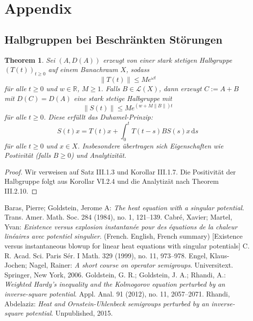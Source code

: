 \documentclass[11pt]{article}
\newtheorem{thm}{Theorem}
\theoremstyle{break}
\begin{document}
\section{Appendix}
\subsection{Halbgruppen bei Beschränkten Störungen}
\begin{thm}\label{bounded}
Sei $(A, D(A))$ erzeugt von einer stark stetigen Halbgruppe $(T(t))_{t\ge 0}$ auf einem Banachraum $X$, sodass
\begin{equation}
\|T(t)\|\le M e^{\omega t}
\end{equation}
für alle $t\ge 0$ und $w\in \mathbb R$, $M\ge 1$. Falls $B\in \mathcal L(X)$, dann erzeugt $C:=A+B$ mit $D(C)=D(A)$ eine stark stetige Halbgruppe mit
\begin{equation}
\|S(t)\|\le M e^{(w+ M\|B\|) t}
\end{equation}
für alle $t\ge 0$. Diese erfüllt das \emph{Duhamel-Prinzip}:
\begin{equation}
S(t) x = T(t) x + \int_0^t T(t-s) B S(s) x \,\mathrm ds
\end{equation}
für alle $t\ge 0$ und $x\in X$. Insbesondere übertragen sich Eigenschaften wie Postivität (falls $B\ge 0$) und Analytizität.
\end{thm}
\begin{proof}
Wir verweisen auf \cite{engel-nagel} Satz III.1.3 und Korollar III.1.7. Die Positivität der Halbgruppe folgt aus \cite{engel-nagel} Korollar VI.2.4 und die Analytizät nach Theorem III.2.10.
\end{proof}

\begin{thebibliography}{tief}
 Baras, Pierre; Goldstein, Jerome A:
{\it The heat equation with a singular potential}.
Trans. Amer. Math. Soc. 284 (1984), no. 1, 121–139.
 Cabré, Xavier; Martel, Yvan:
{\it Existence versus explosion instantanée pour des équations de la chaleur linéaires avec potentiel singulier}. (French. English, French summary) [Existence versus instantaneous blowup for linear heat equations with singular potentials]
C. R. Acad. Sci. Paris Sér. I Math. 329 (1999), no. 11, 973–978. 
 Engel, Klaus-Jochen; Nagel, Rainer:
{\it A short course on operator semigroups}. Universitext. Springer, New York, 2006.
 Goldstein, G. R.; Goldstein, J. A.; Rhandi, A.: {\it Weighted Hardy's inequality and the Kolmogorov equation perturbed by an inverse-square potential}.
Appl. Anal. 91 (2012), no. 11, 2057–2071. 
 Rhandi, Abdelaziz: {\it Heat and Ornstein-Uhlenbeck semigroups perturbed by an inverse-square potential}. 
                     Unpublished, 2015.
\end{thebibliography} 
\end{document}

